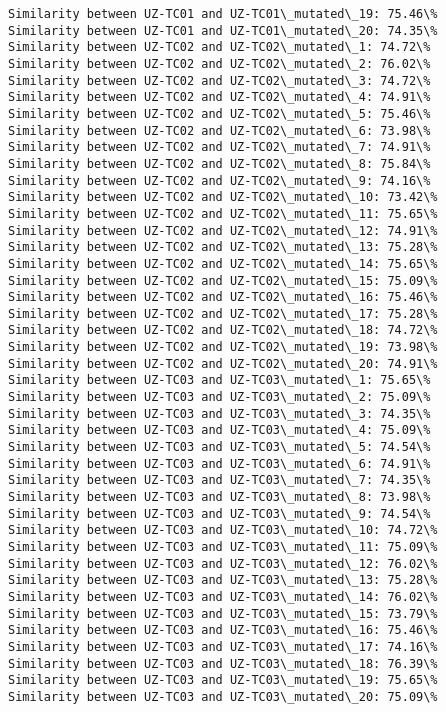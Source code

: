 \documentclass[11pt]{article}
\begin{document}
\begin{Verbatim}[commandchars=\\\{\}]
Similarity between UZ-TC01 and UZ-TC01\_mutated\_19: 75.46\%
Similarity between UZ-TC01 and UZ-TC01\_mutated\_20: 74.35\%
Similarity between UZ-TC02 and UZ-TC02\_mutated\_1: 74.72\%
Similarity between UZ-TC02 and UZ-TC02\_mutated\_2: 76.02\%
Similarity between UZ-TC02 and UZ-TC02\_mutated\_3: 74.72\%
Similarity between UZ-TC02 and UZ-TC02\_mutated\_4: 74.91\%
Similarity between UZ-TC02 and UZ-TC02\_mutated\_5: 75.46\%
Similarity between UZ-TC02 and UZ-TC02\_mutated\_6: 73.98\%
Similarity between UZ-TC02 and UZ-TC02\_mutated\_7: 74.91\%
Similarity between UZ-TC02 and UZ-TC02\_mutated\_8: 75.84\%
Similarity between UZ-TC02 and UZ-TC02\_mutated\_9: 74.16\%
Similarity between UZ-TC02 and UZ-TC02\_mutated\_10: 73.42\%
Similarity between UZ-TC02 and UZ-TC02\_mutated\_11: 75.65\%
Similarity between UZ-TC02 and UZ-TC02\_mutated\_12: 74.91\%
Similarity between UZ-TC02 and UZ-TC02\_mutated\_13: 75.28\%
Similarity between UZ-TC02 and UZ-TC02\_mutated\_14: 75.65\%
Similarity between UZ-TC02 and UZ-TC02\_mutated\_15: 75.09\%
Similarity between UZ-TC02 and UZ-TC02\_mutated\_16: 75.46\%
Similarity between UZ-TC02 and UZ-TC02\_mutated\_17: 75.28\%
Similarity between UZ-TC02 and UZ-TC02\_mutated\_18: 74.72\%
Similarity between UZ-TC02 and UZ-TC02\_mutated\_19: 73.98\%
Similarity between UZ-TC02 and UZ-TC02\_mutated\_20: 74.91\%
Similarity between UZ-TC03 and UZ-TC03\_mutated\_1: 75.65\%
Similarity between UZ-TC03 and UZ-TC03\_mutated\_2: 75.09\%
Similarity between UZ-TC03 and UZ-TC03\_mutated\_3: 74.35\%
Similarity between UZ-TC03 and UZ-TC03\_mutated\_4: 75.09\%
Similarity between UZ-TC03 and UZ-TC03\_mutated\_5: 74.54\%
Similarity between UZ-TC03 and UZ-TC03\_mutated\_6: 74.91\%
Similarity between UZ-TC03 and UZ-TC03\_mutated\_7: 74.35\%
Similarity between UZ-TC03 and UZ-TC03\_mutated\_8: 73.98\%
Similarity between UZ-TC03 and UZ-TC03\_mutated\_9: 74.54\%
Similarity between UZ-TC03 and UZ-TC03\_mutated\_10: 74.72\%
Similarity between UZ-TC03 and UZ-TC03\_mutated\_11: 75.09\%
Similarity between UZ-TC03 and UZ-TC03\_mutated\_12: 76.02\%
Similarity between UZ-TC03 and UZ-TC03\_mutated\_13: 75.28\%
Similarity between UZ-TC03 and UZ-TC03\_mutated\_14: 76.02\%
Similarity between UZ-TC03 and UZ-TC03\_mutated\_15: 73.79\%
Similarity between UZ-TC03 and UZ-TC03\_mutated\_16: 75.46\%
Similarity between UZ-TC03 and UZ-TC03\_mutated\_17: 74.16\%
Similarity between UZ-TC03 and UZ-TC03\_mutated\_18: 76.39\%
Similarity between UZ-TC03 and UZ-TC03\_mutated\_19: 75.65\%
Similarity between UZ-TC03 and UZ-TC03\_mutated\_20: 75.09\%
    \end{Verbatim}
\end{document}
